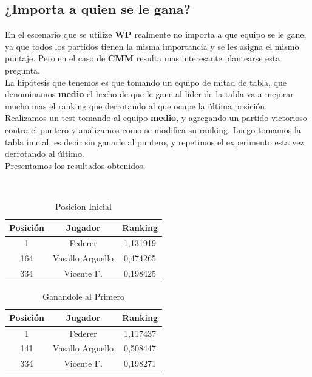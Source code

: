 \subsection{¿Importa a quien se le gana?}

En el escenario que se utilize \textbf{WP} realmente no importa a que equipo se le gane, ya que todos los partidos tienen la misma importancia y se les asigna el mismo puntaje. Pero en el caso de \textbf{CMM} resulta mas interesante plantearse esta pregunta. \\

La hipótesis que tenemos es que tomando un equipo de mitad de tabla, que denominamos \textbf{medio} el hecho de que le gane al lider de la tabla va a mejorar mucho mas el ranking que derrotando al que ocupe la última posición. \\

Realizamos un test tomando al equipo \textbf{medio}, y agregando un partido victorioso contra el puntero y analizamos como se modifica su ranking. Luego tomamos la tabla inicial, es decir sin ganarle al puntero, y repetimos el experimento esta vez derrotando al último. \\

Presentamos los resultados obtenidos.

\\

\begin{table}[H]
\caption{Posicion Inicial}
\centering
\begin{tabular}{c c c}
\hline \hline
    Posición & Jugador & Ranking \\ 
    \hline
    1 & Federer & 1,131919 \\ 
    164 & Vasallo Arguello & 0,474265 \\ 
    334 & Vicente F. & 0,198425 \\ 
    \end{tabular}
\end{table}

\begin{table}[H]
        \caption{Ganandole al Primero}
\centering
\begin{tabular}{c c c}
\hline \hline
    Posición & Jugador & Ranking \\ 
    \hline
    1 & Federer & 1,117437 \\ 
    141 & Vasallo Arguello & 0,508447 \\ 
    334 & Vicente F. & 0,198271 \\ 
    \hline
    \end{tabular}
\end{table}


